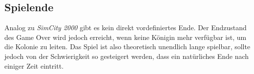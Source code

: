 \subsection{Spielende}
Analog zu \textit{SimCity 2000} gibt es kein direkt vordefiniertes Ende. Der Endzustand des Game Over wird jedoch erreicht, wenn keine Königin mehr verfügbar ist, um die Kolonie zu leiten. Das Spiel ist also theoretisch unendlich lange spielbar, sollte jedoch von der Schwierigkeit so gesteigert werden, dass ein natürliches Ende nach einiger Zeit eintritt.
